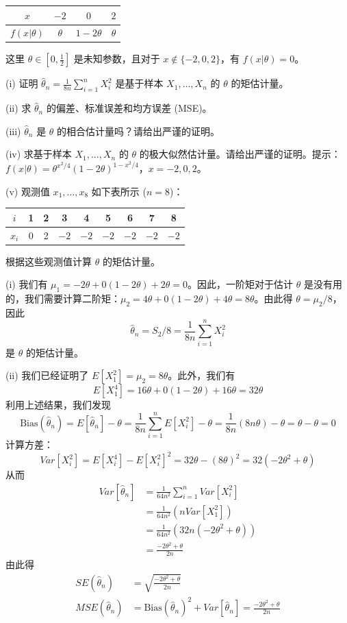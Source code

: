 \begin{questions}
\begin{center}
\begin{tabular}{c|c|c|c}
$x$ & $-2$ & $0$ & $2$ \\ \hline
$f(x|\theta)$ & $\theta$ & $1 - 2\theta$ & $\theta$
\end{tabular}
\end{center}

这里 $\theta \in [0, \frac{1}{2}]$ 是未知参数，且对于 $x \notin \{-2, 0, 2\}$，有 $f(x|\theta) = 0$。

(i) 证明 $\hat{\theta}_n = \frac{1}{8n} \sum_{i=1}^n X_i^2$ 是基于样本 $X_1, \ldots, X_n$ 的 $\theta$ 的矩估计量。

(ii) 求 $\hat{\theta}_n$ 的偏差、标准误差和均方误差 (MSE)。

(iii) $\hat{\theta}_n$ 是 $\theta$ 的相合估计量吗？请给出严谨的证明。

(iv) 求基于样本 $X_1, \ldots, X_n$ 的 $\theta$ 的极大似然估计量。请给出严谨的证明。提示：$f(x|\theta) = \theta^{x^2/4}(1 - 2\theta)^{1-x^2/4}$，$x = -2, 0, 2$。

(v) 观测值 $x_1, \ldots, x_8$ 如下表所示 ($n = 8$)：

\begin{center}
\begin{tabular}{c|c|c|c|c|c|c|c|c}
$i$ & 1 & 2 & 3 & 4 & 5 & 6 & 7 & 8 \\ \hline
$x_i$ & 0 & 2 & $-2$ & $-2$ & $-2$ & $-2$ & $-2$ & $-2$
\end{tabular}
\end{center}

根据这些观测值计算 $\theta$ 的矩估计量。

\begin{solution}
(i) 我们有 $\mu_1 = -2\theta + 0(1 - 2\theta) + 2\theta = 0$。因此，一阶矩对于估计 $\theta$ 是没有用的，我们需要计算二阶矩：$\mu_2 = 4\theta + 0(1 - 2\theta) + 4\theta = 8\theta$。由此得 $\theta = \mu_2 / 8$，因此
\[
\hat{\theta}_n = S_2 / 8 = \frac{1}{8n} \sum_{i=1}^n X_i^2
\]
是 $\theta$ 的矩估计量。

(ii) 我们已经证明了 $E[X_1^2] = \mu_2 = 8\theta$。此外，我们有
\[
E[X_1^4] = 16\theta + 0(1 - 2\theta) + 16\theta = 32\theta
\]
利用上述结果，我们发现
\[
\text{Bias}(\hat{\theta}_n) = E[\hat{\theta}_n] - \theta = \frac{1}{8n} \sum_{i=1}^n E[X_i^2] - \theta = \frac{1}{8n}(8n\theta) - \theta = \theta - \theta = 0
\]
计算方差：
\[
Var[X_i^2] = E[X_i^4] - E[X_i^2]^2 = 32\theta - (8\theta)^2 = 32(-2\theta^2 + \theta)
\]
从而
\begin{align*}
Var[\hat{\theta}_n] &= \frac{1}{64n^2} \sum_{i=1}^n Var[X_i^2] \\
&= \frac{1}{64n^2} (n Var[X_1^2]) \\
&= \frac{1}{64n^2} (32n(-2\theta^2 + \theta)) \\
&= \frac{-2\theta^2 + \theta}{2n}
\end{align*}
由此得
\begin{align*}
SE(\hat{\theta}_n) &= \sqrt{\frac{-2\theta^2 + \theta}{2n}} \\
MSE(\hat{\theta}_n) &= \text{Bias}(\hat{\theta}_n)^2 + Var[\hat{\theta}_n] = \frac{-2\theta^2 + \theta}{2n}
\end{align*}


\end{solution}
\end{questions}
